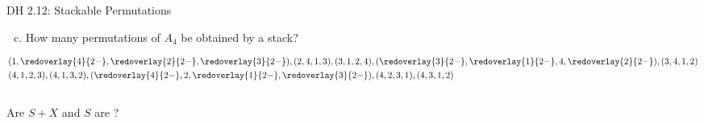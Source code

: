 % 
% 
% 

\begin{frame}{}
  \begin{exampleblock}{DH 2.12: Stackable Permutations}
    \begin{enumerate}[(a)]
      \setcounter{enumi}{2}
      \item How many permutations of $A_4$  be obtained by a stack?
    \end{enumerate}
  \end{exampleblock}

  \begin{align*}
    &(1, \redoverlay{4}{2-}, \redoverlay{2}{2-}, \redoverlay{3}{2-}), (2, 4, 1, 3), (3, 1, 2, 4), 
    (\redoverlay{3}{2-}, \redoverlay{1}{2-}, 4, \redoverlay{2}{2-}), (3, 4, 1, 2) \\
    &(4, 1, 2, 3), (4, 1, 3, 2), (\redoverlay{4}{2-}, 2, \redoverlay{1}{2-}, \redoverlay{3}{2-}), (4, 2, 3, 1), (4, 3, 1, 2)
  \end{align*}

  \vspace{0.60cm}
\end{frame}

\begin{frame}{}
  \begin{columns}[b]
    \pause
  \end{columns}

  \vspace{1.00cm}
  \pause
  \centerline{ Are $S+X$ and $S$ are ?}
  \vspace{0.40cm}
  \vspace{0.40cm}
\end{frame}


